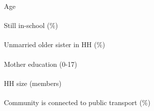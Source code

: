 Age \\
\\
Still in-school ($\%$) \\
\\
Unmarried older sister in HH ($\%$) \\
\\
Mother education (0-17) \\
\\
HH size (members) \\
\\
Community is connected to public transport ($\%$) \\
\\